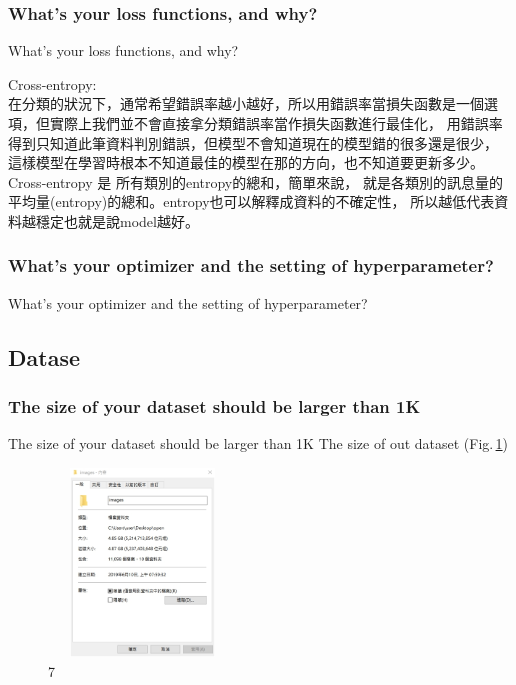 \documentclass{beamer}
\begin{document}
\subsubsection{What's your loss functions, and why?}
\begin{frame}{What's your loss functions, and why?}
  \begin{CJK}{UTF8}{bkai}
	Cross-entropy:\\
	在分類的狀況下，通常希望錯誤率越小越好，所以用錯誤率當損失函數是一個選項，但實際上我們並不會直接拿分類錯誤率當作損失函數進行最佳化，
	用錯誤率得到只知道此筆資料判別錯誤，但模型不會知道現在的模型錯的很多還是很少，
	這樣模型在學習時根本不知道最佳的模型在那的方向，也不知道要更新多少。
	\\
	Cross-entropy 是 所有類別的entropy的總和，簡單來說，
	就是各類別的訊息量的平均量(entropy)的總和。entropy也可以解釋成資料的不確定性，
	所以越低代表資料越穩定也就是說model越好。
   \end{CJK}
\end{frame}

\subsubsection{What's your optimizer and the setting of hyperparameter?  \bigskip \bigskip \bigskip \bigskip}
\begin{frame}{What's your optimizer and the setting of hyperparameter? }

\end{frame}


\subsection{Datase}
\subsubsection{The size of your dataset should be larger than 1K}
\begin{frame}{The size of your dataset should be larger than 1K}
The size of out dataset (Fig.\,\ref{fig:7})
 \begin{figure}
    \includegraphics[width=5cm,height=5cm]{dataset(1).png}
    \caption{7}
    \label{fig:7}
  \end{figure}

\end{frame}
\end{document}
